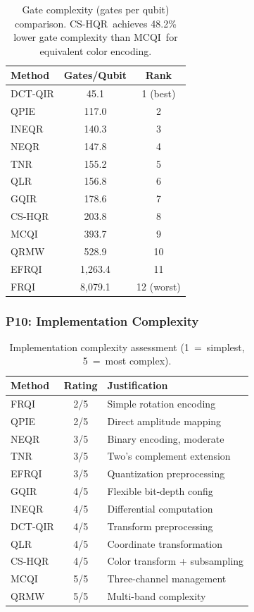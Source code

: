 \documentclass{ipol}
\newcommand{\cshqr}{\textsc{CS-HQR}}
\newcommand{\frqi}{\textsc{FRQI}}
\newcommand{\neqr}{\textsc{NEQR}}
\newcommand{\gqir}{\textsc{GQIR}}
\newcommand{\mcqi}{\textsc{MCQI}}
\begin{document}
\begin{table}[H]
\begin{center}
\begin{tabular}{lcc}
\hline
Method & Gates/Qubit & Rank \\
\hline
DCT-QIR & 45.1 & 1 (best) \\
QPIE & 117.0 & 2 \\
INEQR & 140.3 & 3 \\
\neqr & 147.8 & 4 \\
TNR & 155.2 & 5 \\
QLR & 156.8 & 6 \\
\gqir & 178.6 & 7 \\
\rowcolor{green!15}
\cshqr & 203.8 & 8 \\
\mcqi & 393.7 & 9 \\
QRMW & 528.9 & 10 \\
EFRQI & 1,263.4 & 11 \\
\frqi & 8,079.1 & 12 (worst) \\
\hline
\end{tabular}
\caption{Gate complexity (gates per qubit) comparison. \cshqr\ achieves
  48.2\% lower gate complexity than \mcqi\ for equivalent color encoding.}
\label{tab:gate_complexity}
\end{center}
\end{table}

\FloatBarrier
\subsubsection{P10: Implementation Complexity}

\begin{table}[H]
\begin{center}
\begin{tabular}{lcp{5cm}}
\hline
Method & Rating & Justification \\
\hline
\frqi & 2/5 & Simple rotation encoding \\
QPIE & 2/5 & Direct amplitude mapping \\
\neqr & 3/5 & Binary encoding, moderate \\
TNR & 3/5 & Two's complement extension \\
EFRQI & 3/5 & Quantization preprocessing \\
\gqir & 4/5 & Flexible bit-depth config \\
INEQR & 4/5 & Differential computation \\
DCT-QIR & 4/5 & Transform preprocessing \\
QLR & 4/5 & Coordinate transformation \\
\rowcolor{green!15}
\cshqr & 4/5 & Color transform + subsampling \\
\mcqi & 5/5 & Three-channel management \\
QRMW & 5/5 & Multi-band complexity \\
\hline
\end{tabular}
\caption{Implementation complexity assessment (1~=~simplest, 5~=~most complex).}
\label{tab:impl_complexity}
\end{center}
\end{table}
\end{document}
